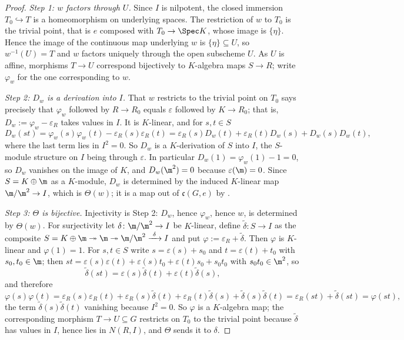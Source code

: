 \begin{proof}
\emph{Step 1: $w$ factors through $U$.}  Since $I$ is nilpotent, the closed
immersion $T_0\hookrightarrow T$ is a homeomorphism on underlying spaces.  The
restriction of $w$ to $T_0$ is the trivial point, that is $e$ composed with
$T_0\to\Spec K$, whose image is $\{\eta\}$.  Hence the image of the continuous
map underlying $w$ is $\{\eta\}\subseteq U$, so $w^{-1}(U)=T$ and $w$ factors
uniquely through the open subscheme $U$.  As $U$ is affine, morphisms $T\to U$
correspond bijectively to $K$-algebra maps $S\to R$; write $\varphi_w$ for the
one corresponding to $w$.

\emph{Step 2: $D_w$ is a derivation into $I$.}  That $w$ restricts to the
trivial point on $T_0$ says precisely that $\varphi_w$ followed by $R\to R_0$
equals $\varepsilon$ followed by $K\to R_0$; that is,
$D_w:=\varphi_w-\varepsilon_R$ takes values in $I$.  It is $K$-linear, and for
$s,t\in S$
\[
  D_w(st)=\varphi_w(s)\varphi_w(t)-\varepsilon_R(s)\varepsilon_R(t)
  =\varepsilon_R(s)D_w(t)+\varepsilon_R(t)D_w(s)+D_w(s)D_w(t),
\]
where the last term lies in $I^2=0$.  So $D_w$ is a $K$-derivation of $S$ into
$I$, the $S$-module structure on $I$ being through $\varepsilon$.  In
particular $D_w(1)=\varphi_w(1)-1=0$, so $D_w$ vanishes on the image of $K$,
and $D_w(\m^2)=0$ because $\varepsilon(\m)=0$.  Since $S=K\oplus\m$ as a
$K$-module, $D_w$ is determined by the induced $K$-linear map $\m/\m^2\to I$,
which is $\Theta(w)$; it is a map out of $\mathfrak c(G,e)$ by
.

\emph{Step 3: $\Theta$ is bijective.}  Injectivity is Step 2: $D_w$, hence
$\varphi_w$, hence $w$, is determined by $\Theta(w)$.  For surjectivity let
$\delta\colon\m/\m^2\to I$ be $K$-linear, define $\tilde\delta\colon S\to I$ as
the composite
$S=K\oplus\m\twoheadrightarrow\m\twoheadrightarrow\m/\m^2
\xrightarrow{\ \delta\ }I$
and put $\varphi:=\varepsilon_R+\tilde\delta$.  Then $\varphi$ is $K$-linear
and $\varphi(1)=1$.  For $s,t\in S$ write $s=\varepsilon(s)+s_0$ and
$t=\varepsilon(t)+t_0$ with $s_0,t_0\in\m$; then
$st=\varepsilon(s)\varepsilon(t)+\varepsilon(s)t_0+\varepsilon(t)s_0+s_0t_0$
with $s_0t_0\in\m^2$, so
\[
  \tilde\delta(st)=\varepsilon(s)\tilde\delta(t)+\varepsilon(t)\tilde\delta(s),
\]
and therefore
\[
  \varphi(s)\varphi(t)
  =\varepsilon_R(s)\varepsilon_R(t)+\varepsilon_R(s)\tilde\delta(t)
   +\varepsilon_R(t)\tilde\delta(s)+\tilde\delta(s)\tilde\delta(t)
  =\varepsilon_R(st)+\tilde\delta(st)=\varphi(st),
\]
the term $\tilde\delta(s)\tilde\delta(t)$ vanishing because $I^2=0$.  So
$\varphi$ is a $K$-algebra map; the corresponding morphism $T\to U\subseteq G$
restricts on $T_0$ to the trivial point because $\tilde\delta$ has values in
$I$, hence lies in $N(R,I)$, and $\Theta$ sends it to $\delta$.
\end{proof}

